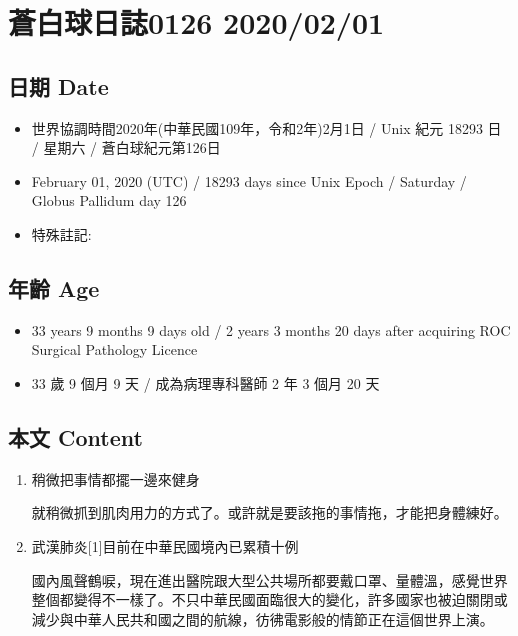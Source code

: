 \documentclass[
]{article}
\date{}
\providecommand{\tightlist}{%
  \setlength{\itemsep}{0pt}\setlength{\parskip}{0pt}}
\begin{document}
\hypertarget{ux84bcux767dux7403ux65e5ux8a8c0126-20200201}{%
\section{蒼白球日誌0126
2020/02/01}\label{ux84bcux767dux7403ux65e5ux8a8c0126-20200201}}

\hypertarget{ux65e5ux671f-date}{%
\subsection{日期 Date}\label{ux65e5ux671f-date}}

\begin{itemize}
\tightlist
\item
  世界協調時間2020年(中華民國109年，令和2年)2月1日 / Unix 紀元 18293 日
  / 星期六 / 蒼白球紀元第126日
\item
  February 01, 2020 (UTC) / 18293 days since Unix Epoch / Saturday /
  Globus Pallidum day 126
\item
  特殊註記:
\end{itemize}

\hypertarget{ux5e74ux9f61-age}{%
\subsection{年齡 Age}\label{ux5e74ux9f61-age}}

\begin{itemize}
\tightlist
\item
  33 years 9 months 9 days old / 2 years 3 months 20 days after
  acquiring ROC Surgical Pathology Licence
\item
  33 歲 9 個月 9 天 / 成為病理專科醫師 2 年 3 個月 20 天
\end{itemize}

\hypertarget{ux672cux6587-content}{%
\subsection{本文 Content}\label{ux672cux6587-content}}

\begin{enumerate}
\def\labelenumi{\arabic{enumi}.}
\item
  稍微把事情都擺一邊來健身

  就稍微抓到肌肉用力的方式了。或許就是要該拖的事情拖，才能把身體練好。
\item
  武漢肺炎{[}1{]}目前在中華民國境內已累積十例

  國內風聲鶴唳，現在進出醫院跟大型公共場所都要戴口罩、量體溫，感覺世界整個都變得不一樣了。不只中華民國面臨很大的變化，許多國家也被迫關閉或減少與中華人民共和國之間的航線，彷彿電影般的情節正在這個世界上演。
\end{enumerate}
\end{document}

